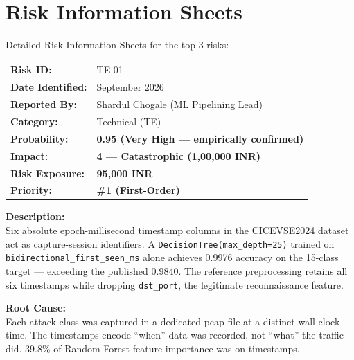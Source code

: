 \documentclass[11pt, a4paper]{article}
\newcommand{\col}[1]{\texttt{\small #1}}
\begin{document}
\section{Risk Information Sheets}
\label{sec:infosheet}

Detailed Risk Information Sheets for the top 3 risks:

\vspace{1em}

\begin{risksheet}

\begin{tabular}{@{}p{3.5cm}p{10cm}@{}}
\textbf{Risk ID:} & TE-01 \\[0.3em]
\textbf{Date Identified:} & September 2026 \\[0.3em]
\textbf{Reported By:} & Shardul Chogale (ML Pipelining Lead) \\[0.3em]
\textbf{Category:} & Technical (TE) \\[0.3em]
\textbf{Probability:} & \textcolor{highrisk}{\textbf{0.95 (Very High --- empirically confirmed)}} \\[0.3em]
\textbf{Impact:} & \textcolor{highrisk}{\textbf{4 --- Catastrophic (1,00,000 INR)}} \\[0.3em]
\textbf{Risk Exposure:} & \textcolor{highrisk}{\textbf{95,000 INR}} \\[0.3em]
\textbf{Priority:} & \textbf{\#1 (First-Order)} \\
\end{tabular}

\vspace{0.5em}
\textbf{Description:}\\
Six absolute epoch-millisecond timestamp columns in the CICEVSE2024 dataset act as capture-session identifiers. A \col{DecisionTree(max\_depth=25)} trained on \col{bidirectional\_first\_seen\_ms} alone achieves 0.9976 accuracy on the 15-class target --- exceeding the published 0.9840. The reference preprocessing retains all six timestamps while dropping \col{dst\_port}, the legitimate reconnaissance feature.

\vspace{0.5em}
\textbf{Root Cause:}\\
Each attack class was captured in a dedicated pcap file at a distinct wall-clock time. The timestamps encode ``when'' data was recorded, not ``what'' the traffic did. 39.8\% of Random Forest feature importance was on timestamps.


\end{risksheet}
\end{document}
